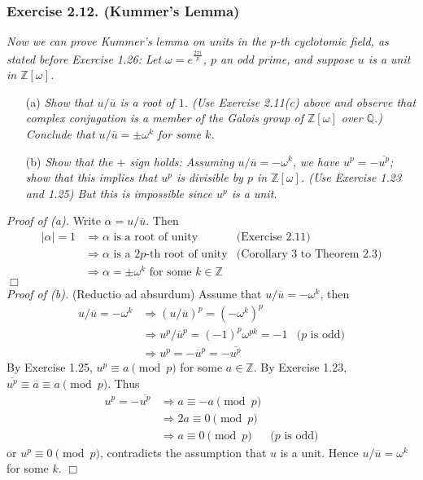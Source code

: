 \documentclass{article}
\begin{document}
\subsubsection*{Exercise 2.12. (Kummer's Lemma)}
\emph{Now we can prove Kummer's lemma on units in the $p$-th cyclotomic field,
as stated before Exercise 1.26:
Let $\omega = e^{\frac{2\pi i}{p}}$, $p$ an odd prime,
and suppose $u$ is a unit in $\mathbb{Z}[\omega]$.}
\begin{enumerate}
\item[(a)]
\emph{Show that $u/\overline{u}$ is a root of $1$.
(Use Exercise 2.11(c) above and observe that complex conjugation is a member of
the Galois group of $\mathbb{Z}[\omega]$ over $\mathbb{Q}$.)
Conclude that $u/\overline{u} = \pm \omega^k$ for some $k$.}
\item[(b)]
\emph{Show that the $+$ sign holds: Assuming $u/\overline{u} = -\omega^k$,
we have $u^p = -\overline{u^p}$;
show that this implies that $u^p$ is divisible by $p$ in $\mathbb{Z}[\omega]$.
(Use Exercise 1.23 and 1.25)
But this is impossible since $u^p$ is a unit.} \\
\end{enumerate}

\emph{Proof of (a).}
Write $\alpha = u/\overline{u}$. Then
\begin{align*}
|\alpha| = 1
&\Longrightarrow
\text{$\alpha$ is a root of unity}
  &\text{(Exercise 2.11)} \\
&\Longrightarrow
\text{$\alpha$ is a $2p$-th root of unity}
  &\text{(Corollary 3 to Theorem 2.3)} \\
&\Longrightarrow
\text{$\alpha = \pm \omega^k$ for some $k \in \mathbb{Z}$}
\end{align*}
$\Box$ \\

\emph{Proof of (b).}
(Reductio ad absurdum)
Assume that $u/\overline{u} = -\omega^k$,
then
\begin{align*}
u/\overline{u} = -\omega^k
&\Longrightarrow
(u/\overline{u})^p = (-\omega^k)^p \\
&\Longrightarrow
u^p/\overline{u}^p = (-1)^p \omega^{pk} = -1
  &\text{($p$ is odd)} \\
&\Longrightarrow
u^p = -\overline{u}^p = -\overline{u^p}
\end{align*}
By Exercise 1.25, $u^p \equiv a \pmod{p}$ for some $a \in \mathbb{Z}$.
By Exercise 1.23, $\overline{u^p} \equiv \overline{a} \equiv a \pmod{p}$.
Thus
\begin{align*}
u^p = -\overline{u^p}
&\Longrightarrow
a \equiv -a \pmod{p} \\
&\Longrightarrow
2a \equiv 0 \pmod{p} \\
&\Longrightarrow
a \equiv 0 \pmod{p}
  &\text{($p$ is odd)}
\end{align*}
or $u^p \equiv 0 \pmod{p}$, contradicts the assumption that $u$ is a unit.
Hence $u/\overline{u} = \omega^k$ for some $k$.
$\Box$ \\\\
\end{document}
